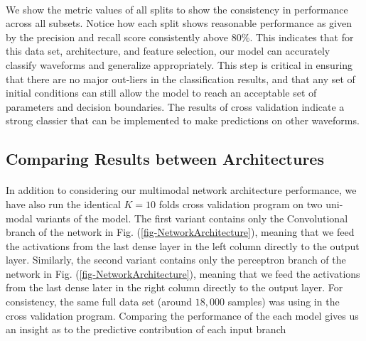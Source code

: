 \documentclass[12pt,letterpaper]{article}
\begin{document}
\paragraph*{}We show the metric values of all splits to show the consistency in performance across all subsets. Notice how each split shows reasonable performance as given by the precision and recall score consistently above 80\%. This indicates that for this data set, architecture, and feature selection, our model can accurately classify waveforms and generalize appropriately. This step is critical in ensuring that there are no major out-liers in the classification results, and that any set of initial conditions can still allow the model to reach an acceptable set of parameters and decision boundaries. The results of cross validation indicate a strong classier that can be implemented to make predictions on other waveforms.


\subsection{Comparing Results between Architectures}

\paragraph*{}In addition to considering our multimodal network architecture performance, we have also run the identical $K = 10$ folds cross validation program on two uni-modal variants of the model. The first variant contains only the Convolutional branch of the network in Fig. (\ref{fig-NetworkArchitecture}), meaning that we feed the activations from the last dense layer in the left column directly to the output layer. Similarly, the second variant contains only the perceptron branch of the network in Fig. (\ref{fig-NetworkArchitecture}), meaning that we feed the activations from the last dense later in the right column directly to the output layer. For consistency, the same full data set (around $18,000$ samples) was using in the cross validation program. Comparing the performance of the each model gives us an insight as to the predictive contribution of each input branch
\end{document}
